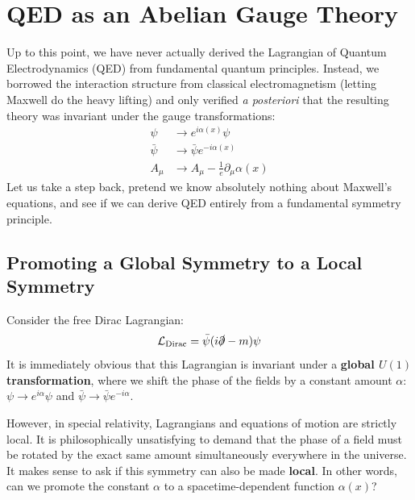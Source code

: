 \section{QED as an Abelian Gauge Theory}

Up to this point, we have never actually derived the Lagrangian of Quantum Electrodynamics (QED) from fundamental quantum principles. Instead, we borrowed the interaction structure from classical electromagnetism (letting Maxwell do the heavy lifting) and only verified \textit{a posteriori} that the resulting theory was invariant under the gauge transformations:
\[
    \begin{aligned}
        \psi       & \to e^{i\alpha(x)}\psi                        \\
        \bar{\psi} & \to \bar{\psi} e^{-i\alpha(x)}                \\
        A_\mu      & \to A_\mu - \frac{1}{e}\partial_\mu \alpha(x)
    \end{aligned}
\]
Let us take a step back, pretend we know absolutely nothing about Maxwell's equations, and see if we can derive QED entirely from a fundamental symmetry principle.

\subsection{Promoting a Global Symmetry to a Local Symmetry}
Consider the free Dirac Lagrangian:
\[
    \mathcal{L}_{\text{Dirac}} = \bar{\psi}(i\slashed{\partial} - m)\psi
\]
It is immediately obvious that this Lagrangian is invariant under a \textbf{global $U(1)$ transformation}, where we shift the phase of the fields by a constant amount $\alpha$: $\psi \to e^{i\alpha}\psi$ and $\bar{\psi} \to \bar{\psi}e^{-i\alpha}$.

However, in special relativity, Lagrangians and equations of motion are strictly local. It is philosophically unsatisfying to demand that the phase of a field must be rotated by the exact same amount simultaneously everywhere in the universe. It makes sense to ask if this symmetry can also be made \textbf{local}. In other words, can we promote the constant $\alpha$ to a spacetime-dependent function $\alpha(x)$?

